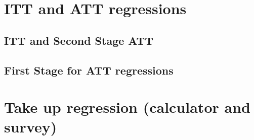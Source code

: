 \documentclass[12pt]{article}
\theoremstyle{named}
\newcommand{\folder}{./Effect}
\begin{document}
\pagebreak

\section{ITT and ATT regressions}

\begin{landscape}
\subsection*{ITT and Second Stage ATT}

\begin{center}
\scriptsize{}
\end{center}

\end{landscape}

\pagebreak


\subsection*{First Stage for ATT regressions}

\begin{center}
\scriptsize{}
\end{center}


\section{Take up regression (calculator and survey)}


\begin{center}
\scriptsize{}
\end{center}


\end{document}
